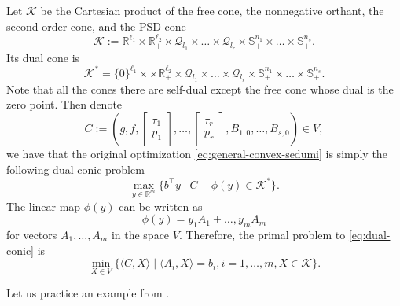 \documentclass[
]{book}
\theoremstyle{definition}
\theoremstyle{definition}
\theoremstyle{definition}
\theoremstyle{definition}
\theoremstyle{remark}
\begin{document}
Let \(\mathcal{K}\) be the Cartesian product of the free cone, the nonnegative orthant, the second-order cone, and the PSD cone
\[
\mathcal{K}:= \mathbb{R}^{\ell_1} \times \mathbb{R}^{\ell_2}_{+} \times \mathcal{Q}_{l_1} \times \dots \times \mathcal{Q}_{l_r} \times \mathbb{S}^{n_1}_{+} \times \dots \times \mathbb{S}^{n_s}_{+}.
\]
Its dual cone is
\[
\mathcal{K}^* = \{0\}^{\ell_1} \times \times \mathbb{R}^{\ell_2}_{+} \times \mathcal{Q}_{l_1} \times \dots \times \mathcal{Q}_{l_r} \times \mathbb{S}^{n_1}_{+} \times \dots \times \mathbb{S}^{n_s}_{+}.
\]
Note that all the cones there are self-dual except the free cone whose dual is the zero point. Then denote
\[
C := \left( g,f,\begin{bmatrix} \tau_1 \\ p_1 \end{bmatrix},\dots,\begin{bmatrix} \tau_r \\ p_r \end{bmatrix},B_{1,0},\dots,B_{s,0} \right) \in V,
\]
we have that the original optimization \eqref{eq:general-convex-sedumi} is simply the following dual conic problem
\begin{equation}
\max_{y \in \mathbb{R}^{m}} \{ b^\top y \mid C - \phi(y) \in \mathcal{K}^* \}.
\label{eq:dual-conic}
\end{equation}
The linear map \(\phi(y)\) can be written as
\[
\phi(y) = y_1 A_1 + \dots, y_m A_m
\]
for vectors \(A_1,\dots,A_m\) in the space \(V\). Therefore, the primal problem to \eqref{eq:dual-conic} is
\begin{equation}
\min_{X \in V} \{ \langle C, X \rangle \mid \langle A_i, X \rangle=b_i,i=1,\dots,m,X \in \mathcal{K} \}.
\label{eq:primal-conic}
\end{equation}

Let us practice an example from \citep{nie23book-moment}.
\end{document}
